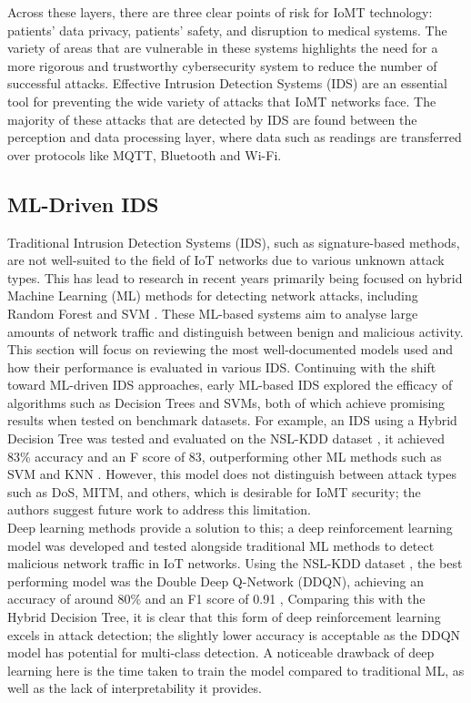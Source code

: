 \documentclass[11pt,a4paper]{article}
\begin{document}
Across these layers, there are three clear points of risk for IoMT technology: patients' data privacy, patients' safety, and disruption to medical systems. The variety of areas that are vulnerable in these systems highlights the need for a more rigorous and trustworthy cybersecurity system to reduce the number of successful attacks. 
Effective Intrusion Detection Systems (IDS) are an essential tool for preventing the wide variety of attacks that IoMT networks face. The majority of these attacks that are detected by IDS are found between the perception and data processing layer, where data such as readings are transferred over protocols like MQTT, Bluetooth and Wi-Fi. 

\subsection{ML-Driven IDS}
Traditional Intrusion Detection Systems (IDS), such as signature-based methods, are not well-suited to the field of IoT networks due to various unknown attack types. This has lead to research in recent years primarily being focused on hybrid Machine Learning (ML) methods for detecting network attacks, including Random Forest and SVM \cite{da2019internet}.
These ML-based systems aim to analyse large amounts of network traffic and distinguish between benign and malicious activity. 
This section will focus on reviewing the most well-documented models used and how their performance is evaluated in various IDS. Continuing with the shift toward ML-driven IDS approaches, early ML-based IDS explored the efficacy of algorithms such as Decision Trees and SVMs, both of which achieve promising results when tested on benchmark datasets. For example, an IDS using a Hybrid Decision Tree was tested and evaluated on the NSL-KDD dataset \cite{nslkdddataset}, it achieved 83\% accuracy and an F score of 83, outperforming other ML methods such as SVM and KNN \cite{taghavinejad2020intrusion}. However, this model does not distinguish between attack types such as DoS, MITM, and others, which is desirable for IoMT security; the authors suggest future work to address this limitation. 
\\
Deep learning methods provide a solution to this; a deep reinforcement learning model was developed and tested alongside traditional ML methods to detect malicious network traffic in IoT networks. Using the NSL-KDD dataset \cite{nslkdddataset}, the best performing model was the Double Deep Q-Network (DDQN), achieving an accuracy of around 80\% and an F1 score of 0.91 \cite{lopez2020application}, Comparing this with the Hybrid Decision Tree, it is clear that this form of deep reinforcement learning excels in attack detection; the slightly lower accuracy is acceptable as the DDQN model has potential for multi-class detection. A noticeable drawback of deep learning here is the time taken to train the model compared to traditional ML, as well as the lack of interpretability it provides. 
\end{document}
